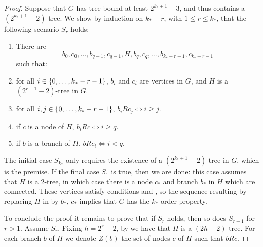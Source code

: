 \begin{theorem}
\begin{proof}
            Suppose that $G$ has tree bound at least $2^{k_*+1}-3$, and thus contains a $(2^{k_*+1}-2)$-tree.
            We show by induction on $k_*-r$, with $1 \leq r \leq k_*$, that the following scenario $S_r$ holds:
            \begin{enumerate}
                \item\label{itm:tree_implies_order.1} There are
                    \[
                        b_0, c_0, \dots, b_{q-1}, c_{q-1}, H, b_q, c_q, \dots, b_{k_*-r-1}, c_{k_*-r-1}
                    \]
                    such that:
                \item\label{itm:tree_implies_order.2} for all $i \in \{ 0, \dots, k_*-r-1 \}$, $b_i$ and $c_i$ are vertices in $G$,
                    and $H$ is a $(2^{r+1}-2)$-tree in $G$.
                \item\label{itm:tree_implies_order.3} for all $i,j \in \{ 0, \dots, k_*-r-1 \}$, $b_i R c_j \Leftrightarrow i \geq j$.
                \item\label{itm:tree_implies_order.4} if $c$ is a node of $H$, $b_i R c \Leftrightarrow i \geq q$.
                \item\label{itm:tree_implies_order.5} if $b$ is a branch of $H$, $b R c_i \Leftrightarrow i < q$.
            \end{enumerate}

            The initial case $S_{k_*}$ only requires the existence of a $(2^{k_*+1}-2)$-tree in $G$, which is the premise.
            If the final case $S_1$ is true, then we are done:
            this case assumes that $H$ is a $2$-tree, in which case there is a node $c_*$ and branch $b_*$ in $H$ which
            are connected.
            These vertices satisfy conditions  and , so
            the sequence resulting by replacing $H$ in  by $b_*$, $c_*$ implies that $G$
            has the $k_*$-order property.

            To conclude the proof it remains to prove that if $S_r$ holds, then so does $S_{r-1}$ for $r>1$.
            Assume $S_r$.
            Fixing $h = 2^r - 2$, by  we have that $H$ is a $(2h +2)$-tree.
            For each branch $b$ of $H$ we denote $Z(b)$ the set of nodes $c$ of $H$ such that $b R c$.


\end{proof}
\end{theorem}
